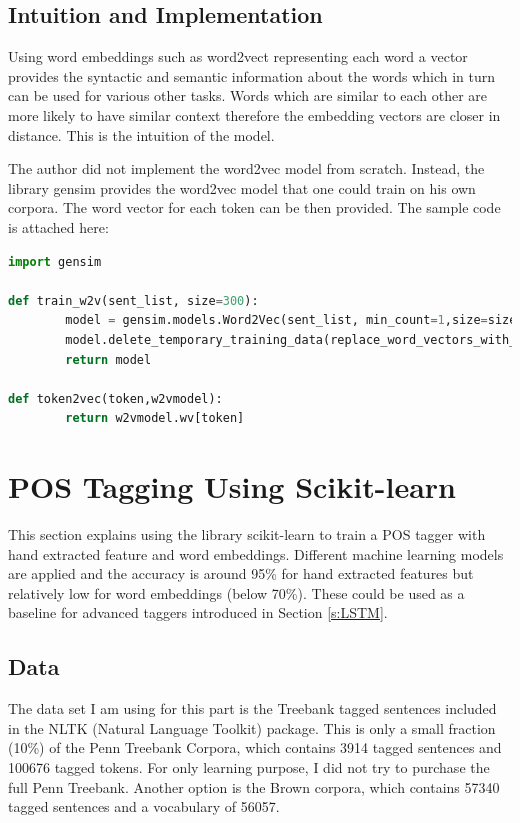 \documentclass[11pt]{article}
\theoremstyle{plain}
\begin{document}
\subsection{Intuition and Implementation}

Using word embeddings such as word2vect representing each word a vector 
provides the syntactic and semantic information about the words which in 
turn can be used for various other tasks. Words which are similar to each 
other are more likely to have similar context therefore the embedding vectors 
are closer in distance. This is the intuition of the model. 

The author did not implement the word2vec model from scratch. Instead, the 
library gensim provides the word2vec model that one could train on his own 
corpora. The word vector for each token can be then provided. The sample 
code is attached here:

 \begin{lstlisting}[language=Python]
import gensim

def train_w2v(sent_list, size=300):
		model = gensim.models.Word2Vec(sent_list, min_count=1,size=size)
		model.delete_temporary_training_data(replace_word_vectors_with_normalized=True)
		return model

def token2vec(token,w2vmodel):
		return w2vmodel.wv[token]
\end{lstlisting}


\section{POS Tagging Using Scikit-learn}
\label{s:pos-sklearn}

This section explains using the library scikit-learn to train a POS tagger with 
hand extracted feature and word embeddings. Different machine learning 
models are applied and the accuracy is around 95\% for hand extracted 
features but relatively low for word embeddings (below 70\%). These could 
be used as a baseline for advanced taggers introduced in Section 
\ref{s:LSTM}. 

\subsection{Data}

The data set I am using for this part is the Treebank tagged sentences 
included in the NLTK (Natural Language Toolkit) package. This is only a small 
fraction (10\%) of the Penn Treebank Corpora, which contains 3914 tagged 
sentences and 100676 tagged tokens. For only learning purpose, I did not try 
to purchase the full Penn Treebank. Another option is the Brown corpora, 
which contains 57340 tagged sentences and a vocabulary of 56057. 
\end{document}
